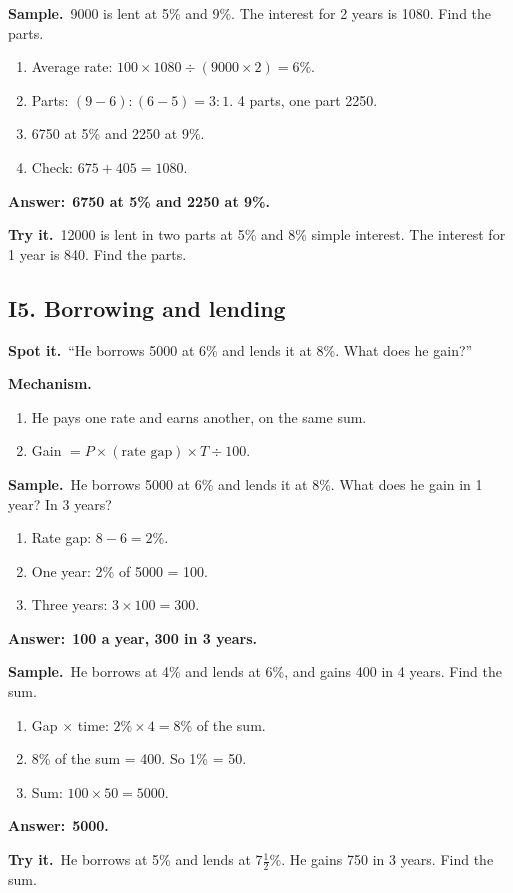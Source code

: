 \documentclass[11pt,a4paper]{article}
\let\oldsubsection\subsection
\renewcommand{\subsection}{\needspace{9\baselineskip}\oldsubsection}
\newcommand{\spot}{\textbf{\color{ember}Spot it.}\ }
\newcommand{\mech}{\textbf{\color{ember}Mechanism.}\ }
\newif\ifkeepsamp
\newcommand{\ans}[1]{\par\nopagebreak\noindent\textbf{\color{ember}Answer:}\ \textbf{#1}\par}
\newcommand{\samp}{\ifkeepsamp\needspace{4\baselineskip}\fi\textbf{\color{ember}Sample.}\ }
\newcommand{\tryit}[1]{\textbf{\color{ember}Try it.}\ #1}
\begin{document}
\samp 9000 is lent at 5\% and 9\%. The interest for 2 years is 1080. Find the parts.
\begin{enumerate}
\item Average rate: $100 \times 1080 \div (9000 \times 2) = 6\%$.
\item Parts: $(9 - 6) : (6 - 5) = 3 : 1$. 4 parts, one part 2250.
\item 6750 at 5\% and 2250 at 9\%.
\item Check: $675 + 405 = 1080$.
\end{enumerate}
\ans{6750 at 5\% and 2250 at 9\%.}

\tryit 12000 is lent in two parts at 5\% and 8\% simple interest. The interest for 1 year is 840. Find the parts.

\subsection{I5. Borrowing and lending}
\spot ``He borrows 5000 at 6\% and lends it at 8\%. What does he gain?''

\mech
\begin{enumerate}
\item He pays one rate and earns another, on the same sum.
\item Gain $= P \times (\text{rate gap}) \times T \div 100$.
\end{enumerate}

\samp He borrows 5000 at 6\% and lends it at 8\%. What does he gain in 1 year? In 3 years?
\begin{enumerate}
\item Rate gap: $8 - 6 = 2\%$.
\item One year: 2\% of 5000 = 100.
\item Three years: $3 \times 100 = 300$.
\end{enumerate}
\ans{100 a year, 300 in 3 years.}

\samp He borrows at 4\% and lends at 6\%, and gains 400 in 4 years. Find the sum.
\begin{enumerate}
\item Gap $\times$ time: $2\% \times 4 = 8\%$ of the sum.
\item 8\% of the sum = 400. So 1\% = 50.
\item Sum: $100 \times 50 = 5000$.
\end{enumerate}
\ans{5000.}

\tryit He borrows at 5\% and lends at $7\tfrac12\%$. He gains 750 in 3 years. Find the sum.
\end{document}
